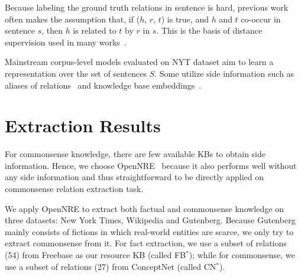 \documentclass[11pt,a4paper]{article}
\newcommand{\KZ}[1]{\textcolor{blue}{Kenny: #1}}
\begin{document}
Because labeling the ground truth relations in sentence is hard,
previous work often makes the assumption that, if ($h$, $r$, $t$) is true,
and $h$ and $t$ co-occur in sentence $s$, then $h$ is related to $t$ by $r$ in
$s$. This is the basis of distance supervision used in many works~\cite{riedel2010modeling, mintz2009distant}.


Mainstream corpus-level models evaluated on NYT dataset aim to learn a representation over the set of sentences $S$. Some utilize side information such as aliases of relations~\cite{vashishth2018reside} and knowledge base embeddings~\cite{xu2019connecting}. 

\section{Extraction Results}

For commonsense knowledge, there are few available KBs to obtain side information. 
Hence, we choose OpenNRE~\cite{lin2016neural} because it also performs well without any side information and thus straightforward to be directly applied on commonsense relation extraction task.

We apply OpenNRE to extract both factual and commonsense knowledge
on three datasets: New York Times, Wikipedia and Gutenberg. Because 
Gutenberg mainly consists of fictions in which real-world entities are
scarce, we only try to extract commonsense from it. 
For fact extraction, we use a subset of relations (54) from Freebase as
our resource KB (called FB$^*$); while for commonsense, we use a 
subset of relations (27) from ConceptNet (called CN$^*$).
\end{document}
